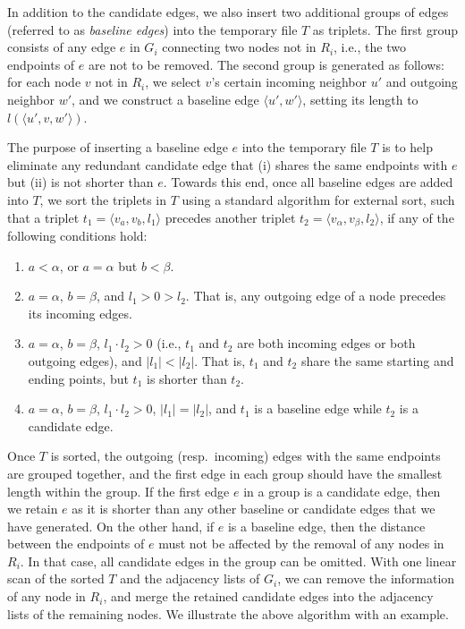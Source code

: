 \documentclass{sig-alternate}
\begin{document}
\begin{sloppy}
In addition to the candidate edges, we also insert two additional groups of edges (referred to as {\em baseline edges}) into the temporary file $T$ as triplets. The first group consists of any edge $e$ in $G_i$ connecting two nodes not in $R_i$, i.e., the two endpoints of $e$ are not to be removed. The second group is generated as follows: for each node $v$ not in $R_i$, we select $v$'s certain incoming neighbor $u'$ and outgoing neighbor $w'$, and we construct a baseline edge $\langle u', w'\rangle$, setting its length to $l(\langle u', v, w'\rangle)$.

The purpose of inserting a baseline edge $e$ into the temporary file $T$ is to help eliminate any redundant candidate edge that (i) shares the same endpoints with $e$ but (ii) is not shorter than $e$. Towards this end, once all baseline edges are added into $T$, we sort the triplets in $T$ using a standard algorithm for external sort, such that a triplet $t_1 = \langle v_a, v_b, l_1\rangle$ precedes another triplet $t_2 = \langle v_\alpha, v_\beta, l_2\rangle$, if any of the following conditions hold:
\begin{enumerate} [itemsep = 0.5mm, topsep = 2mm]%
\item $a < \alpha$, or $a = \alpha$ but $b < \beta$.

\item $a = \alpha$, $b = \beta$, and $l_1 > 0 > l_2$. That is, any outgoing edge of a node precedes its incoming edges.

\item $a = \alpha$, $b = \beta$, $l_1 \cdot l_2 > 0$ (i.e., $t_1$ and $t_2$ are both incoming edges or both outgoing edges), and $|l_1| < |l_2|$. That is, $t_1$ and $t_2$ share the same starting and ending points, but $t_1$ is shorter than $t_2$.

\item $a = \alpha$, $b = \beta$, $l_1 \cdot l_2 > 0$, $|l_1| = |l_2|$, and $t_1$ is a baseline edge while $t_2$ is a candidate edge.
\end{enumerate}
Once $T$ is sorted, the outgoing (resp.\ incoming) edges with the same endpoints are grouped together, and the first edge in each group should have the smallest length within the group. If the first edge $e$ in a group
is a candidate edge, then we retain $e$ as it is shorter than any other baseline or candidate edges that we have generated. On the other hand, if $e$ is a baseline edge, then the distance between the endpoints of $e$ must not be affected by the removal of any nodes in $R_i$. In that case, all candidate edges in the group can be omitted. With one linear scan of the sorted $T$ and the adjacency lists of $G_i$, we can remove the information of any node in $R_i$, and merge the retained candidate edges into the adjacency lists of the remaining nodes. We illustrate the above algorithm with an example.


\end{sloppy}
\end{document}
